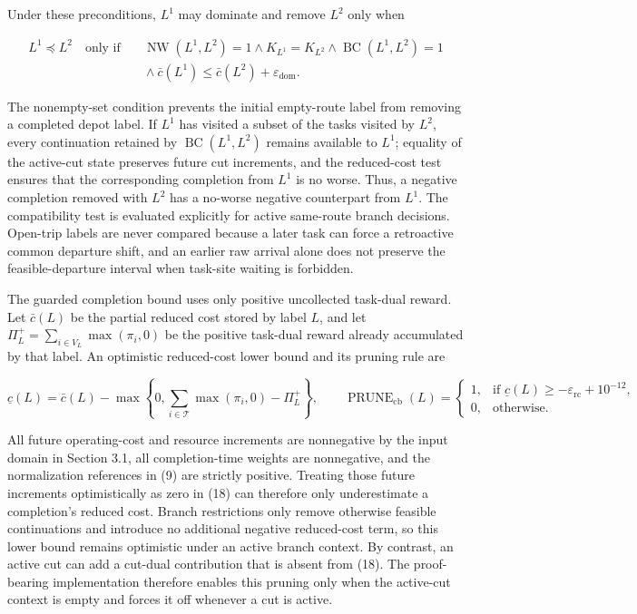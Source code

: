 \documentclass[
  11pt,
]{article}
\begin{document}
Under these preconditions, \(L^1\) may dominate and remove \(L^2\) only
when

\[
\begin{aligned}
L^1\preceq L^2\quad\text{only if}\quad&
\operatorname{NW}(L^1,L^2)=1
\land K_{L^1}=K_{L^2}
\land \operatorname{BC}(L^1,L^2)=1\\
&{}\land \bar c(L^1)\le\bar c(L^2)+\varepsilon_{\mathrm{dom}} .
\end{aligned}
\tag{17}
\]

The nonempty-set condition prevents the initial empty-route label from
removing a completed depot label. If \(L^1\) has visited a subset of the
tasks visited by \(L^2\), every continuation retained by
\(\operatorname{BC}(L^1,L^2)\) remains available to \(L^1\); equality of
the active-cut state preserves future cut increments, and the
reduced-cost test ensures that the corresponding completion from \(L^1\)
is no worse. Thus, a negative completion removed with \(L^2\) has a
no-worse negative counterpart from \(L^1\). The compatibility test is
evaluated explicitly for active same-route branch decisions. Open-trip
labels are never compared because a later task can force a retroactive
common departure shift, and an earlier raw arrival alone does not
preserve the feasible-departure interval when task-site waiting is
forbidden.

The guarded completion bound uses only positive uncollected task-dual
reward. Let \(\bar c(L)\) be the partial reduced cost stored by label
\(L\), and let \(\Pi_L^+=\sum_{i\in V_L}\max(\pi_i,0)\) be the positive
task-dual reward already accumulated by that label. An optimistic
reduced-cost lower bound and its pruning rule are

\[
\underline c(L)
=\bar c(L)-
\max\!\left\{0,\sum_{i\in\mathcal{T}}\max(\pi_i,0)-\Pi_L^+\right\},
\qquad
\operatorname{PRUNE}_{\mathrm{cb}}(L)
=
\begin{cases}
1, &
\text{if }\underline c(L)\ge-\varepsilon_{\mathrm{rc}}+10^{-12},\\
0, & \text{otherwise}.
\end{cases}
\tag{18}
\]

All future operating-cost and resource increments are nonnegative by the
input domain in Section 3.1, all completion-time weights are
nonnegative, and the normalization references in (9) are strictly
positive. Treating those future increments optimistically as zero in
(18) can therefore only underestimate a completion's reduced cost.
Branch restrictions only remove otherwise feasible continuations and
introduce no additional negative reduced-cost term, so this lower bound
remains optimistic under an active branch context. By contrast, an
active cut can add a cut-dual contribution that is absent from (18). The
proof-bearing implementation therefore enables this pruning only when
the active-cut context is empty and forces it off whenever a cut is
active.
\end{document}
